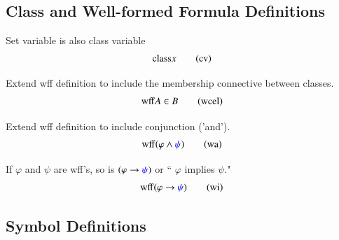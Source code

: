 
\subsection{Class and Well-formed Formula Definitions}\label{sec:clwff}

\begin{definition} Set variable is also class variable
\begin{align}
{\rm class} x\label{eq:cv}\tag{cv}
\end{align}
\end{definition}
\begin{definition} Extend wff definition to include the
membership connective between
       classes.
\begin{align}
{\rm wff} A \in B\label{eq:wcel}\tag{wcel}
\end{align}
\end{definition}

\begin{definition} Extend wff definition to include conjunction
('and').
\begin{align}
{\rm wff} ( \varphi \wedge \mw{\psi} )\label{eq:wa}\tag{wa}
\end{align}
\end{definition}
\begin{definition} If $\varphi$ and $\psi$ are wff's, so is $(
\varphi  \rightarrow  \mw{\psi} )$ or `` $\varphi$ implies
     $\psi$." 
\begin{align}
{\rm wff} ( \varphi \rightarrow \mw{\psi} )\label{eq:wi}\tag{wi}
\end{align}
\end{definition}

\subsection{Symbol Definitions}\label{sec:symdef}

